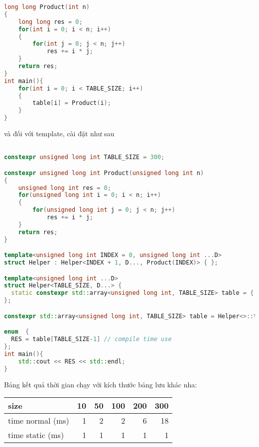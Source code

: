 \begin{lstlisting}[caption={Thử nghiệm tính nhân phân phối},label={code:dot},language=C++]
long long Product(int n)
{
    long long res = 0;
    for(int i = 0; i < n; i++)
    {
        for(int j = 0; j < n; j++)
            res += i * j;
    }
    return res;
}
int main(){
    for(int i = 0; i < TABLE_SIZE; i++)
    {
        table[i] = Product(i);
    }
}
\end{lstlisting}
và đối với template, cài đặt như sau 
\begin{lstlisting}[caption={Thử nghiệm tính nhân phân phối với template},label={code:dot_template},language=C++]

constexpr unsigned long int TABLE_SIZE = 300;

constexpr unsigned long int Product(unsigned long int n)
{
    unsigned long int res = 0;
    for(unsigned long int i = 0; i < n; i++)
    {
        for(unsigned long int j = 0; j < n; j++)
            res += i * j;
    }
    return res;
}

template<unsigned long int INDEX = 0, unsigned long int ...D>
struct Helper : Helper<INDEX + 1, D..., Product(INDEX)> { };

template<unsigned long int ...D>
struct Helper<TABLE_SIZE, D...> {
  static constexpr std::array<unsigned long int, TABLE_SIZE> table = { D... };
};

constexpr std::array<unsigned long int, TABLE_SIZE> table = Helper<>::table;

enum  {
  RES = table[TABLE_SIZE-1] // compile time use
};
int main(){
    std::cout << RES << std::endl; 
}
\end{lstlisting}

\noindent Bảng kết quả thời gian chạy với kích thước bảng lưu khác nha:
\begin{table}[!ht]
\centering
\begin{tabular}{|lrrrrr}
\hline
\multicolumn{1}{|l|}{size}        & \multicolumn{1}{r|}{10} & \multicolumn{1}{r|}{50} & \multicolumn{1}{r|}{100} & \multicolumn{1}{r|}{200} & \multicolumn{1}{r|}{300} \\ \hline
\multicolumn{1}{|l|}{time normal (ms)} & \multicolumn{1}{r|}{1}  & \multicolumn{1}{r|}{2}  & \multicolumn{1}{r|}{2}   & \multicolumn{1}{r|}{6}   & \multicolumn{1}{r|}{18}  \\ \hline
\multicolumn{1}{|l|}{time static (ms)} & \multicolumn{1}{r|}{1}  & \multicolumn{1}{r|}{1}  & \multicolumn{1}{r|}{1}   & \multicolumn{1}{r|}{1}   & \multicolumn{1}{r|}{1}   \\ \hline
\end{tabular}
\end{table}

